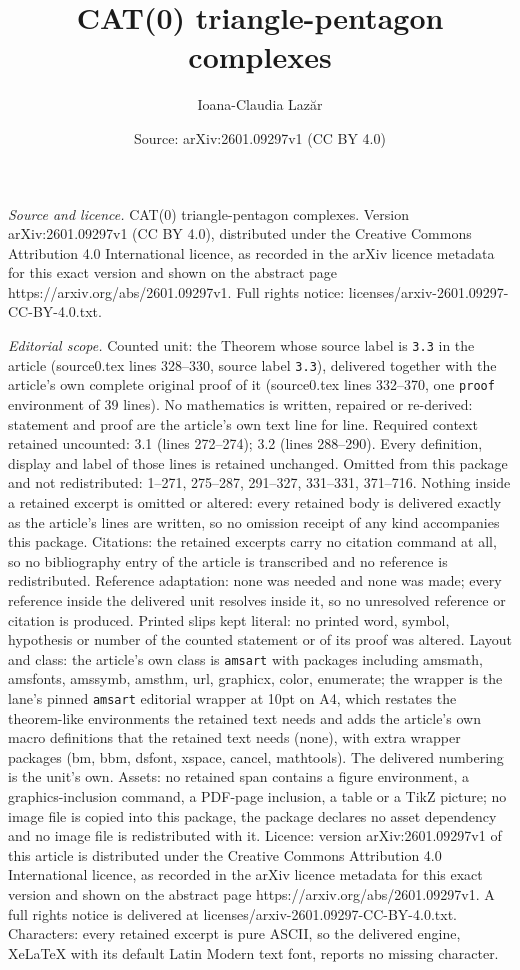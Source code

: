 \documentclass[10pt,a4paper]{amsart}
\title[CAT(0) triangle-pentagon complexes]{CAT(0) triangle-pentagon complexes}
\author{Ioana-Claudia Laz\u{a}r}
\date{Source: arXiv:2601.09297v1 (CC BY 4.0)}
\begin{document}
\maketitle

\noindent\emph{Source and licence.} CAT(0) triangle-pentagon complexes. Version arXiv:2601.09297v1 (CC BY 4.0), distributed under the Creative Commons Attribution 4.0 International licence, as recorded in the arXiv licence metadata for this exact version and shown on the abstract page https://arxiv.org/abs/2601.09297v1. Full rights notice: licenses/arxiv-2601.09297-CC-BY-4.0.txt.\par\smallskip

\noindent\textit{Editorial scope.} Counted unit: the Theorem whose source label is \texttt{3.3} in the article (source0.tex lines 328--330, source label \texttt{3.3}), delivered together with the article's own complete original proof of it (source0.tex lines 332--370, one \texttt{proof} environment of 39 lines). No mathematics is written, repaired or re-derived: statement and proof are the article's own text line for line. Required context retained uncounted: 3.1 (lines 272--274); 3.2 (lines 288--290). Every definition, display and label of those lines is retained unchanged. Omitted from this package and not redistributed: 1--271, 275--287, 291--327, 331--331, 371--716. Nothing inside a retained excerpt is omitted or altered: every retained body is delivered exactly as the article's lines are written, so no omission receipt of any kind accompanies this package. Citations: the retained excerpts carry no citation command at all, so no bibliography entry of the article is transcribed and no reference is redistributed. Reference adaptation: none was needed and none was made; every reference inside the delivered unit resolves inside it, so no unresolved reference or citation is produced. Printed slips kept literal: no printed word, symbol, hypothesis or number of the counted statement or of its proof was altered. Layout and class: the article's own class is \texttt{amsart} with packages including amsmath, amsfonts, amssymb, amsthm, url, graphicx, color, enumerate; the wrapper is the lane's pinned \texttt{amsart} editorial wrapper at 10pt on A4, which restates the theorem-like environments the retained text needs and adds the article's own macro definitions that the retained text needs (none), with extra wrapper packages (bm, bbm, dsfont, xspace, cancel, mathtools). The delivered numbering is the unit's own. Assets: no retained span contains a figure environment, a graphics-inclusion command, a PDF-page inclusion, a table or a TikZ picture; no image file is copied into this package, the package declares no asset dependency and no image file is redistributed with it. Licence: version arXiv:2601.09297v1 of this article is distributed under the Creative Commons Attribution 4.0 International licence, as recorded in the arXiv licence metadata for this exact version and shown on the abstract page https://arxiv.org/abs/2601.09297v1. A full rights notice is delivered at licenses/arxiv-2601.09297-CC-BY-4.0.txt. Characters: every retained excerpt is pure ASCII, so the delivered engine, XeLaTeX with its default Latin Modern text font, reports no missing character.
\end{document}

